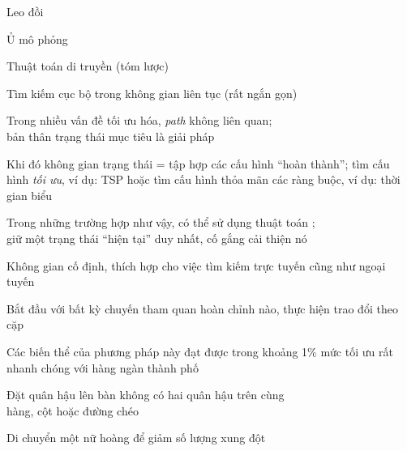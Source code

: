 \documentclass{article}
\begin{document}
\begin{huge}

\sf


\blob Leo đồi

\blob Ủ mô phỏng

\blob Thuật toán di truyền (tóm lược)

\blob Tìm kiếm cục bộ trong không gian liên tục (rất ngắn gọn)



Trong nhiều vấn đề tối ưu hóa, \emph{path} không liên quan;\\
bản thân trạng thái mục tiêu là giải pháp

Khi đó không gian trạng thái = tập hợp các cấu hình ``hoàn thành'';\nl
tìm cấu hình \emph{tối ưu}, ví dụ: TSP\nl
hoặc tìm cấu hình thỏa mãn các ràng buộc, ví dụ: thời gian biểu

Trong những trường hợp như vậy, có thể sử dụng thuật toán ;\\
giữ một trạng thái “hiện tại” duy nhất, cố gắng cải thiện nó

Không gian cố định, thích hợp cho việc tìm kiếm trực tuyến cũng như ngoại tuyến





Bắt đầu với bất kỳ chuyến tham quan hoàn chỉnh nào, thực hiện trao đổi theo cặp

\vspace*{0.3in}

\textwidth
{}

Các biến thể của phương pháp này đạt được trong khoảng 1\% mức tối ưu rất nhanh chóng với
hàng ngàn thành phố



Đặt quân hậu  lên bàn  không có hai quân hậu
trên cùng \\
hàng, cột hoặc đường chéo

Di chuyển một nữ hoàng để giảm số lượng xung đột


\end{huge}
\end{document}
